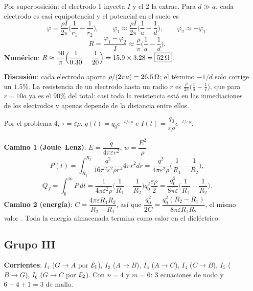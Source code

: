 Por superposición: el electrodo 1 inyecta $I$ y el 2 la extrae. Para $d\gg a$, cada electrodo es casi equipotencial y el potencial en el suelo es
\[
\varphi=\frac{\rho I}{2\pi}\Big(\frac1{r_1}-\frac1{r_2}\Big),\qquad\varphi_1\approx\frac{\rho I}{2\pi}\Big(\frac1a-\frac1d\Big),\qquad\varphi_2\approx-\varphi_1.
\]
\[
R=\frac{\varphi_1-\varphi_2}{I}\approx\boxed{\frac{\rho}{\pi}\Big(\frac1a-\frac1d\Big)}.
\]
\textbf{Numérico}: $R\approx\dfrac{50}{\pi}\Big(\dfrac1{0.30}-\dfrac1{20}\Big)=15.9\times3.28=\boxed{52\ohm}$.

\textbf{Discusión}: cada electrodo aporta $\rho/(2\pi a)=26.5\ohm$; el término $-1/d$ solo corrige un $1.5\%$. La resistencia de un electrodo hasta un radio $r$ es $\frac{\rho}{2\pi}\big(\frac1a-\frac1r\big)$, que para $r=10a$ ya es el $90\%$ del total: casi toda la resistencia está en las inmediaciones de los electrodos y apenas depende de la distancia entre ellos.

Por el problema 4, $\tau=\varepsilon\rho$, $q(t)=q_0e^{-t/\varepsilon\rho}$ e $I(t)=\dfrac{q_0}{\varepsilon\rho}e^{-t/\varepsilon\rho}$.

\textbf{Camino 1 (Joule--Lenz)}: $E=\dfrac{q}{4\pi\varepsilon r^2}$, $w=\dfrac{E^2}{\rho}$:
\[
P(t)=\int_{R_1}^{R_2}\frac{q^2}{16\pi^2\varepsilon^2\rho r^4}4\pi r^2dr=\frac{q^2}{4\pi\varepsilon^2\rho}\Big(\frac1{R_1}-\frac1{R_2}\Big),
\]
\[
Q_J=\int_0^\infty P\,dt=\frac{1}{4\pi\varepsilon^2\rho}\Big(\frac1{R_1}-\frac1{R_2}\Big)q_0^2\frac{\varepsilon\rho}{2}=\boxed{\frac{q_0^2}{8\pi\varepsilon}\Big(\frac1{R_1}-\frac1{R_2}\Big)}.
\]
\textbf{Camino 2 (energía)}: $C=\dfrac{4\pi\varepsilon R_1R_2}{R_2-R_1}$, así que $\dfrac{q_0^2}{2C}=\dfrac{q_0^2(R_2-R_1)}{8\pi\varepsilon R_1R_2}$, el mismo valor \checkmark. Toda la energía almacenada termina como calor en el dieléctrico.

\subsection*{Grupo III}
\begin{center}\circSdosK\end{center}
\textbf{Corrientes}: $I_1$ ($G\to A$ por $\fem_1$), $I_2$ ($A\to B$), $I_3$ ($A\to C$), $I_4$ ($C\to B$), $I_5$ ($B\to G$), $I_6$ ($G\to C$ por $\fem_2$). Con $n=4$ y $m=6$: 3 ecuaciones de nodo y $6-4+1=3$ de malla.

